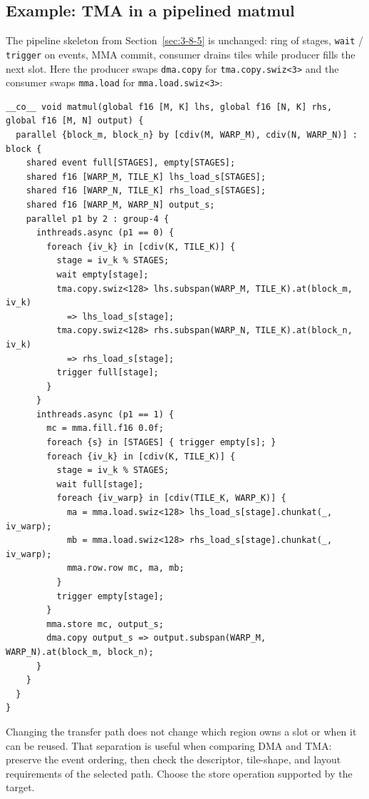 \subsection*{Example: TMA in a pipelined matmul}

The pipeline skeleton from Section~\ref{sec:3-8-5} is unchanged: ring of stages, \texttt{wait} / \texttt{trigger} on events, MMA commit, consumer drains tiles while producer fills the next slot. Here the producer swaps \texttt{dma.copy} for \texttt{tma.\allowbreak{}copy.\allowbreak{}swiz\textless{}3\textgreater{}} and the consumer swaps \texttt{mma.load} for \texttt{mma.\allowbreak{}load.\allowbreak{}swiz\textless{}3\textgreater{}}:

\begin{lstlisting}[language=croqtile,caption={Example: TMA in a pipelined matmul}]
__co__ void matmul(global f16 [M, K] lhs, global f16 [N, K] rhs, global f16 [M, N] output) {
  parallel {block_m, block_n} by [cdiv(M, WARP_M), cdiv(N, WARP_N)] : block {
    shared event full[STAGES], empty[STAGES];
    shared f16 [WARP_M, TILE_K] lhs_load_s[STAGES];
    shared f16 [WARP_N, TILE_K] rhs_load_s[STAGES];
    shared f16 [WARP_M, WARP_N] output_s;
    parallel p1 by 2 : group-4 {
      inthreads.async (p1 == 0) {
        foreach {iv_k} in [cdiv(K, TILE_K)] {
          stage = iv_k % STAGES;
          wait empty[stage];
          tma.copy.swiz<128> lhs.subspan(WARP_M, TILE_K).at(block_m, iv_k)
            => lhs_load_s[stage];
          tma.copy.swiz<128> rhs.subspan(WARP_N, TILE_K).at(block_n, iv_k)
            => rhs_load_s[stage];
          trigger full[stage];
        }
      }
      inthreads.async (p1 == 1) {
        mc = mma.fill.f16 0.0f;
        foreach {s} in [STAGES] { trigger empty[s]; }
        foreach {iv_k} in [cdiv(K, TILE_K)] {
          stage = iv_k % STAGES;
          wait full[stage];
          foreach {iv_warp} in [cdiv(TILE_K, WARP_K)] {
            ma = mma.load.swiz<128> lhs_load_s[stage].chunkat(_, iv_warp);
            mb = mma.load.swiz<128> rhs_load_s[stage].chunkat(_, iv_warp);
            mma.row.row mc, ma, mb;
          }
          trigger empty[stage];
        }
        mma.store mc, output_s;
        dma.copy output_s => output.subspan(WARP_M, WARP_N).at(block_m, block_n);
      }
    }
  }
}
\end{lstlisting}

Changing the transfer path does not change which region owns a slot or when it can be reused. That separation is useful when comparing DMA and TMA: preserve the event ordering, then check the descriptor, tile-shape, and layout requirements of the selected path. Choose the store operation supported by the target.
